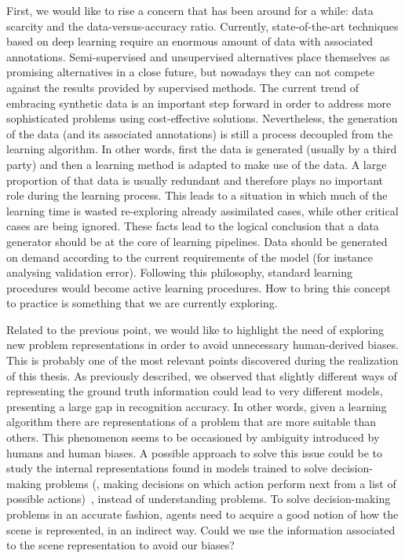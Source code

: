 First, we would like to rise a concern that has been around for a while: data scarcity and the data-versus-accuracy ratio. Currently, state-of-the-art techniques based on deep learning require an enormous amount of data with associated annotations. Semi-supervised and unsupervised alternatives place themselves as promising  alternatives in a close future, but nowadays they can not compete against the results provided by supervised methods. The current trend of embracing synthetic data is an important step forward in order to address more sophisticated problems using cost-effective solutions. Nevertheless, the generation of the data (and its associated annotations) is still a process decoupled from the learning algorithm. In other words, first the data is generated (usually by a third party) and then a learning method is adapted to make use of the data. A large proportion of that data is usually redundant and therefore plays no important role during the learning process. This leads to a situation in which much of the learning time is wasted re-exploring already assimilated cases, while other critical cases are being ignored. These facts lead to the logical conclusion that a data generator should be at the core of learning pipelines. Data should be generated on demand according to the current requirements of the model (for instance analysing validation error). Following this philosophy, standard learning procedures would become active learning procedures. How to bring this concept to practice is something that we are currently exploring.

Related to the previous point, we would like to highlight the need of exploring new problem representations in order to avoid unnecessary human-derived biases. This is probably one of the most relevant points discovered during the realization of this thesis. As previously described, we observed that slightly different ways of representing the ground truth information could lead to very different models, presenting a large gap in recognition accuracy. In other words, given a learning algorithm there are representations of a problem that are more suitable than others. This phenomenon seems to be occasioned by ambiguity introduced by humans and human biases. A possible approach to solve this issue could be to study the internal representations found in models trained to solve decision-making problems (\eg, making decisions on which action perform next from a list of possible actions)~\cite{BojarskiTDFFGJM16}, instead of understanding problems. To solve decision-making problems in an accurate fashion, agents need to acquire a good notion of how the scene is represented, in an indirect way. Could we use the information associated to the scene representation to avoid our biases?

